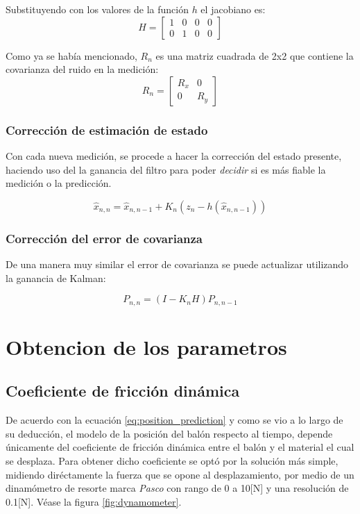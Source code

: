 Substituyendo con los valores de la función $h$ el jacobiano es:
\begin{equation}
	H =
	\begin{bmatrix}
	1 & 0 & 0 & 0\\
	0 & 1 & 0 & 0
	\end{bmatrix}
\end{equation}

Como ya se había mencionado, $R_n$ es una matriz cuadrada de 2x2 que contiene la covarianza del ruido en la medición:
\begin{equation}
	R_n = 
	\begin{bmatrix}
	R_x & 0\\
	0  & R_y
	\end{bmatrix}
\end{equation} 

		\subsubsection*{Corrección de estimación de estado}
	Con cada nueva medición, se procede a hacer la corrección del estado presente, haciendo uso del la ganancia del filtro para poder \textit{decidir} si es más fiable la medición o la predicción.

\begin{equation}
\hat{x}_{n,n} = \hat{x}_{n,n-1} + K_n(z_n - h (\hat{x}_{n,n-1}))
\label{eq:prediction_eq}
\end{equation}
	
		\subsubsection*{Corrección del error de covarianza}
	De una manera muy similar el error de covarianza se puede actualizar utilizando la ganancia de Kalman:

\begin{equation}
P_{n,n} = (I - K_n H) P_{n,n-1}
\end{equation}

	\section{Obtencion de los parametros}
		\subsection*{Coeficiente de fricción dinámica}
	De acuerdo con la ecuación \ref{eq:position_prediction} y como se vio a lo largo de su deducción, el modelo de la posición del balón respecto al tiempo, depende únicamente del coeficiente de fricción dinámica entre el balón y el material el cual se desplaza. Para obtener dicho coeficiente se optó por la solución más simple, midiendo diréctamente la fuerza que se opone al desplazamiento, por medio de un dinamómetro de resorte marca \textit{Pasco} con rango de 0 a 10[N] y una resolución de 0.1[N]. Véase la figura \ref{fig:dynamometer}. 
	
